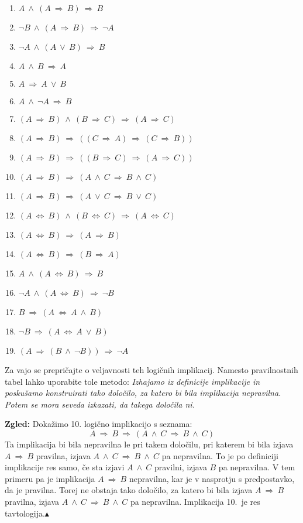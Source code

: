 \documentclass[11pt,paper=b5,footinclude,headinclude]{scrbook} %
\def\ali {{~\vee~}}
\def\inn {{~\wedge~}}
\def\sledi {{~\Rightarrow~}}
\def\cee {{~\Leftrightarrow~}}
\def\zgled{\noindent\textbf{\color{blue} Zgled: }}
\def\kz{{\hfill{\color{blue}$\blacktriangle$}}}%
\begin{document}
\begin{enumerate}
  \item $A \inn (A \sledi B) \sledi B$
  \item $\neg B \inn (A \sledi B) \sledi \neg A$
  \item $\neg A \inn (A \ali B) \sledi B$
  \item $A \inn B \sledi A$
  \item $A \sledi A\ali B$
  \item $A \inn \neg A\sledi B$
  \item $(A \sledi B) \inn (B \sledi C) \sledi (A\sledi C)$
  \item $(A \sledi B) \sledi ((C \sledi A) \sledi (C\sledi B))$
  \item $(A \sledi B) \sledi ((B \sledi C) \sledi (A\sledi C))$
  \item $(A \sledi B) \sledi (A\inn C \sledi B\inn C)$
  \item $(A \sledi B) \sledi (A\ali C \sledi B\ali C)$
  \item $(A \cee B) \inn (B\cee C) \sledi (A\cee C)$
  \item $(A \cee B) \sledi (A\sledi B)$
  \item $(A \cee B) \sledi (B\sledi A)$
  \item $A \inn (A \cee B) \sledi B$
  \item $\neg A \inn (A \cee B) \sledi \neg B$
  \item $B\sledi (A\cee A \inn B)$
  \item $\neg B\sledi (A\cee A \ali B)$
  \item $(A\sledi (B\inn \neg B)) \sledi \neg A$
\end{enumerate}

Za vajo se prepričajte o veljavnosti teh logičnih implikacij. Namesto pravilnostnih tabel lahko uporabite tole metodo:  {\em Izhajamo iz definicije implikacije in poskušamo konstruirati tako določilo, za katero bi bila implikacija nepravilna. Potem se mora seveda izkazati, da takega določila ni.}

\bigskip
\zgled
Dokažimo 10. logično implikacijo s seznama:
$$A \sledi B \sledi (A\inn C \sledi B\inn C)$$
Ta implikacija bi bila nepravilna le pri takem določilu, pri katerem bi bila izjava
$A \sledi B$ pravilna, izjava $A\inn C \sledi B\inn C$ pa nepravilna. To je po definiciji implikacije res samo, če sta izjavi $A\inn C$ pravilni, izjava $B$ pa nepravilna.
V tem primeru pa je implikacija $A \sledi B$ nepravilna, kar je v nasprotju s predpostavko, da je
pravilna. Torej ne obstaja tako določilo, za katero bi bila izjava  $A \sledi B$ pravilna, izjava $A\inn C \sledi B\inn C$ pa nepravilna. Implikacija 10.~je res tavtologija.\kz
\end{document}
